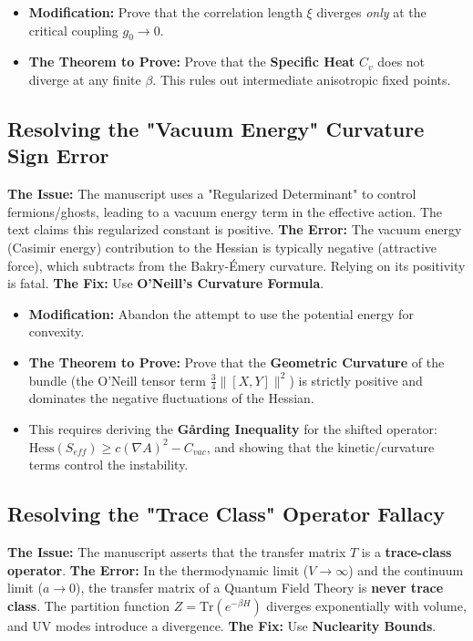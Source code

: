 \begin{itemize}
    \item \textbf{Modification:} Prove that the correlation length $\xi$ diverges \textit{only} at the critical coupling $g_0 \to 0$.
    \item \textbf{The Theorem to Prove:} Prove that the \textbf{Specific Heat} $C_v$ does not diverge at any finite $\beta$. This rules out intermediate anisotropic fixed points.
\end{itemize}

\subsection{Resolving the "Vacuum Energy" Curvature Sign Error}
\textbf{The Issue:} The manuscript uses a "Regularized Determinant" to control fermions/ghosts, leading to a vacuum energy term in the effective action. The text claims this regularized constant is positive.
\textbf{The Error:} The vacuum energy (Casimir energy) contribution to the Hessian is typically negative (attractive force), which subtracts from the Bakry-Émery curvature. Relying on its positivity is fatal.
\textbf{The Fix:} Use \textbf{O'Neill's Curvature Formula}.

\begin{itemize}
    \item \textbf{Modification:} Abandon the attempt to use the potential energy for convexity.
    \item \textbf{The Theorem to Prove:} Prove that the \textbf{Geometric Curvature} of the bundle (the O'Neill tensor term $\frac{3}{4} \|[X,Y]\|^2$) is strictly positive and dominates the negative fluctuations of the Hessian.
    \item This requires deriving the \textbf{Gårding Inequality} for the shifted operator: $\text{Hess}(S_{eff}) \ge c (\nabla A)^2 - C_{vac}$, and showing that the kinetic/curvature terms control the instability.
\end{itemize}

\subsection{Resolving the "Trace Class" Operator Fallacy}
\textbf{The Issue:} The manuscript asserts that the transfer matrix $T$ is a \textbf{trace-class operator}.
\textbf{The Error:} In the thermodynamic limit ($V \to \infty$) and the continuum limit ($a \to 0$), the transfer matrix of a Quantum Field Theory is \textbf{never trace class}. The partition function $Z = \text{Tr}(e^{-\beta H})$ diverges exponentially with volume, and UV modes introduce a divergence.
\textbf{The Fix:} Use \textbf{Nuclearity Bounds}.

